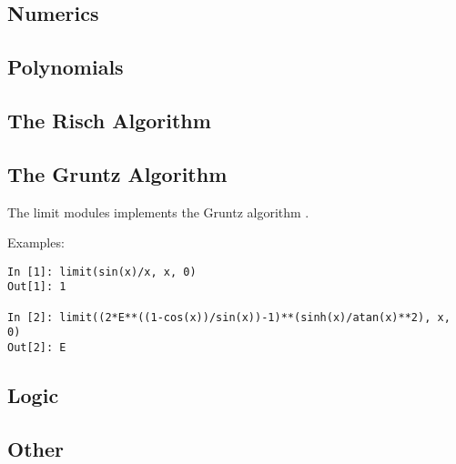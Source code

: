


\subsection{Numerics}

\subsection{Polynomials}

\subsection{The Risch Algorithm}

\subsection{The Gruntz Algorithm}

The limit modules implements the Gruntz algorithm %
.

Examples:
\begin{verbatim}
In [1]: limit(sin(x)/x, x, 0)
Out[1]: 1

In [2]: limit((2*E**((1-cos(x))/sin(x))-1)**(sinh(x)/atan(x)**2), x, 0)
Out[2]: E
\end{verbatim}


\subsection{Logic}

\subsection{Other}
